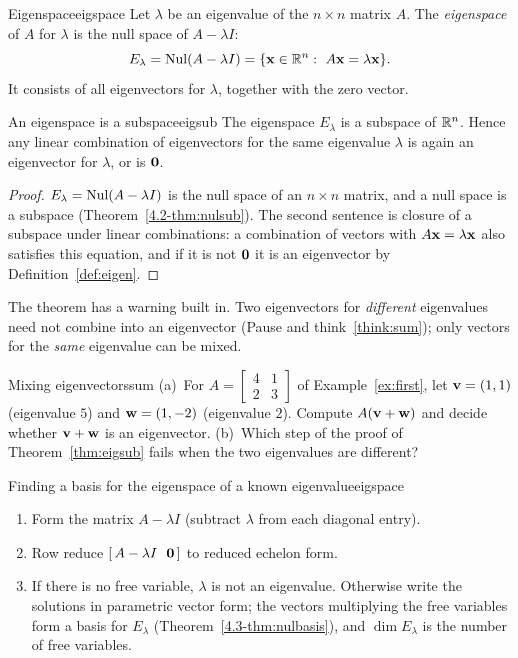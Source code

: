 \documentclass[11pt]{article}
\begin{document}
\begin{defn}{Eigenspace}{eigspace}
Let $\lambda$ be an eigenvalue of the $n\times n$ matrix $A$. The \emph{eigenspace} of $A$ for $\lambda$ is the null space of $A-\lambda I$:
\[
E_\lambda=\operatorname{Nul}(A-\lambda I)=\{\mathbf{x}\in\mathbb{R}^n:\ A\mathbf{x}=\lambda\mathbf{x}\}.
\]
It consists of all eigenvectors for $\lambda$, together with the zero vector.
\end{defn}

\begin{thm}{An eigenspace is a subspace}{eigsub}
The eigenspace $E_\lambda$ is a subspace of $\mathbb{R}^n$. Hence any linear combination of eigenvectors for the same eigenvalue $\lambda$ is again an eigenvector for $\lambda$, or is $\mathbf{0}$.
\end{thm}

\begin{proof}
$E_\lambda=\operatorname{Nul}(A-\lambda I)$ is the null space of an $n\times n$ matrix, and a null space is a subspace (Theorem~\ref{4.2-thm:nulsub}). The second sentence is closure of a subspace under linear combinations: a combination of vectors with $A\mathbf{x}=\lambda\mathbf{x}$ also satisfies this equation, and if it is not $\mathbf{0}$ it is an eigenvector by Definition~\ref{def:eigen}.
\end{proof}

The theorem has a warning built in. Two eigenvectors for \emph{different} eigenvalues need not combine into an eigenvector (Pause and think~\ref{think:sum}); only vectors for the \emph{same} eigenvalue can be mixed.

\begin{think}{Mixing eigenvectors}{sum}
(a)~For $A=\begin{bmatrix}4&1\\2&3\end{bmatrix}$ of Example~\ref{ex:first}, let $\mathbf{v}=(1,1)$ (eigenvalue $5$) and $\mathbf{w}=(1,-2)$ (eigenvalue $2$). Compute $A(\mathbf{v}+\mathbf{w})$ and decide whether $\mathbf{v}+\mathbf{w}$ is an eigenvector. (b)~Which step of the proof of Theorem~\ref{thm:eigsub} fails when the two eigenvalues are different?
\end{think}

\begin{proc}{Finding a basis for the eigenspace of a known eigenvalue}{eigspace}
\begin{enumerate}[itemsep=1pt]
  \item Form the matrix $A-\lambda I$ (subtract $\lambda$ from each diagonal entry).
  \item Row reduce $[\,A-\lambda I\ \ \bv{0}\,]$ to reduced echelon form.
  \item If there is no free variable, $\lambda$ is not an eigenvalue. Otherwise write the solutions in parametric vector form; the vectors multiplying the free variables form a basis for $E_\lambda$ (Theorem~\ref{4.3-thm:nulbasis}), and $\dim E_\lambda$ is the number of free variables.
\end{enumerate}
\end{proc}
\end{document}
